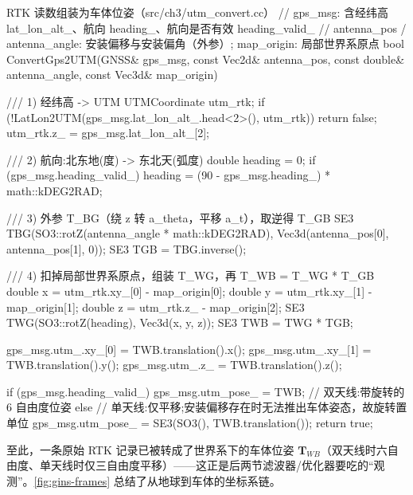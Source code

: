 \begin{codebox}[C++]{RTK 读数组装为车体位姿（src/ch3/utm\_convert.cc）}
// gps_msg: 含经纬高 lat_lon_alt_、航向 heading_、航向是否有效 heading_valid_
// antenna_pos / antenna_angle: 安装偏移与安装偏角（外参）; map_origin: 局部世界系原点
bool ConvertGps2UTM(GNSS& gps_msg, const Vec2d& antenna_pos, const double& antenna_angle,
                    const Vec3d& map_origin) {
  /// 1) 经纬高 -> UTM
  UTMCoordinate utm_rtk;
  if (!LatLon2UTM(gps_msg.lat_lon_alt_.head<2>(), utm_rtk)) return false;
  utm_rtk.z_ = gps_msg.lat_lon_alt_[2];

  /// 2) 航向:北东地(度) -> 东北天(弧度)
  double heading = 0;
  if (gps_msg.heading_valid_) heading = (90 - gps_msg.heading_) * math::kDEG2RAD;

  /// 3) 外参 T_BG（绕 z 转 a_theta，平移 a_t），取逆得 T_GB
  SE3 TBG(SO3::rotZ(antenna_angle * math::kDEG2RAD), Vec3d(antenna_pos[0], antenna_pos[1], 0));
  SE3 TGB = TBG.inverse();

  /// 4) 扣掉局部世界系原点，组装 T_WG，再 T_WB = T_WG * T_GB
  double x = utm_rtk.xy_[0] - map_origin[0];
  double y = utm_rtk.xy_[1] - map_origin[1];
  double z = utm_rtk.z_     - map_origin[2];
  SE3 TWG(SO3::rotZ(heading), Vec3d(x, y, z));
  SE3 TWB = TWG * TGB;

  gps_msg.utm_.xy_[0] = TWB.translation().x();
  gps_msg.utm_.xy_[1] = TWB.translation().y();
  gps_msg.utm_.z_     = TWB.translation().z();

  if (gps_msg.heading_valid_) {
    gps_msg.utm_pose_ = TWB;                           // 双天线:带旋转的 6 自由度位姿
  } else {
    // 单天线:仅平移;安装偏移存在时无法推出车体姿态，故旋转置单位
    gps_msg.utm_pose_ = SE3(SO3(), TWB.translation());
  }
  return true;
}
\end{codebox}

\noindent{}至此，一条原始 RTK 记录已被转成了世界系下的车体位姿 $\mathbf{T}_{WB}$（双天线时六自由度、单天线时仅三自由度平移）——这正是后两节滤波器/优化器要吃的“观测”。\cref{fig:gins-frames} 总结了从地球到车体的坐标系链。

